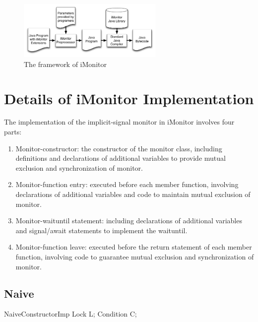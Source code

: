 \documentclass[preprint]{sigplanconf}
\begin{document}
\begin{figure}[h!]
  \centering
  \includegraphics[width=70mm]{fig/flow.png}
  \caption{The framework of iMonitor}
  \label{fig:framework}
\end{figure}



\section{Details of iMonitor Implementation} \label{sec:imp}
The implementation of the implicit-signal monitor in iMonitor involves four 
parts:
\begin{enumerate}
  \item Monitor-constructor: the constructor of the monitor class, including 
    definitions and declarations of additional variables to provide mutual 
    exclusion and synchronization of monitor. 
  \item Monitor-function entry: executed before each member function, 
    involving declarations of additional variables and code to maintain
    mutual exclusion of monitor. 
  \item Monitor-waituntil statement: including declarations of additional
    variables and signal/await statements to implement the waituntil.
  \item Monitor-function leave: executed before the return statement of 
    each member function, involving code to guarantee mutual exclusion and 
    synchronization of monitor. 
\end{enumerate}



\subsection{Naive}

\begin{SaveVerbatim}{NaiveConstructorImp}
Lock L;
Condition C;
\end{SaveVerbatim}
\end{document}
